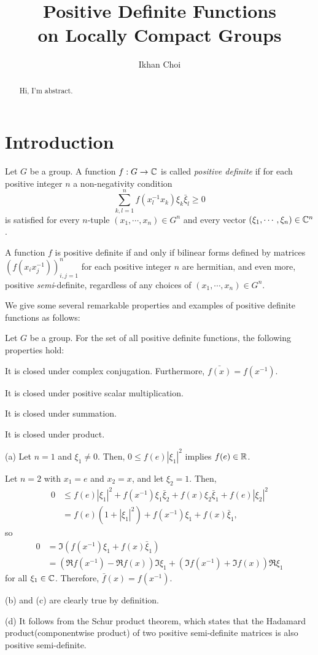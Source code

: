 \documentclass[12pt]{article}
\title{Positive Definite Functions\\on Locally Compact Groups}
\author{Ikhan Choi}
\begin{document}
\maketitle
\tableofcontents

\begin{abstract}
Hi, I'm abstract.
\end{abstract}

\section{Introduction}


\begin{defn}
Let $G$ be a group.
A function $f:G\to\mathbb{C}$ is called \emph{positive definite} if for each positive integer $n$ a non-negativity condition
\[\sum_{k,l=1}^nf(x_l^{-1}x_k)\xi_k\bar\xi_l\ge0\]
is satisfied for every $n$-tuple $(x_1,\cdots,x_n)\in G^n$ and every vector $(\xi_1,\cdots,\xi_n)\in\mathbb{C}^n$.
\end{defn}
A function $f$ is positive definite if and only if bilinear forms defined by matrices $(f(x_ix_j^{-1}))_{i,j=1}^n$ for each positive integer $n$ are hermitian, and even more, positive \emph{semi}-definite, regardless of any choices of $(x_1,\cdots,x_n)\in G^n$.

We give some several remarkable properties and examples of positive definite functions as follows:

\begin{prop}
Let $G$ be a group.
For the set of all positive definite functions, the following properties hold:
\begin{parts}
\item It is closed under complex conjugation. Furthermore, $\bar{f(x)}=f(x^{-1})$.
\item It is closed under positive scalar multiplication.
\item It is closed under summation.
\item It is closed under product.
\end{parts}
\end{prop}
\begin{pf}
(a)
Let $n=1$ and $\xi_1\ne0$.
Then, $0\le f(e)|\xi_1|^2$ implies $f(e)\in\mathbb{R}$.

Let $n=2$ with $x_1=e$ and $x_2=x$, and let $\xi_2=1$.
Then,
\begin{align*}
0&\le f(e)|\xi_1|^2+f(x^{-1})\xi_1\bar\xi_2+f(x)\xi_2\bar\xi_1+f(e)|\xi_2|^2\\
&=f(e)(1+|\xi_1|^2)+f(x^{-1})\xi_1+f(x)\bar\xi_1,
\end{align*}
so
\begin{align*}
0&=\Im(f(x^{-1})\xi_1+f(x)\bar\xi_1)\\
&=(\Re f(x^{-1})-\Re f(x))\Im\xi_1+(\Im f(x^{-1})+\Im f(x))\Re\xi_1
\end{align*}
for all $\xi_1\in\mathbb{C}$.
Therefore, $\bar f(x)=f(x^{-1})$.

(b) and (c) are clearly true by definition.

(d) It follows from the Schur product theorem, which states that the Hadamard product(componentwise product) of two positive semi-definite matrices is also positive semi-definite.
\end{pf}
\end{document}
